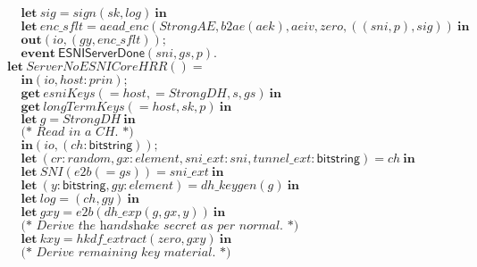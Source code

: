\documentclass{article}
\theoremstyle{definition}
\newcommand{\kwl}[1]{\mathbf{#1}}
\newcommand{\kwt}[1]{\mathsf{#1}}
\newcommand{\kwe}[1]{\mathsf{#1}}
\newcommand{\var}[1]{\mathit{#1}}
\theoremstyle{definition}
\begin{document}
\begin{tabbing}
$\ \ \ \ \ \kwl{let}\ \var{sig} = \var{sign}(\var{sk}, \var{log})\ \kwl{in} $\\
$\ \ \ \ \ \kwl{let}\ \var{enc{\_}sflt} = \var{aead{\_}enc}(\var{StrongAE}, \var{b2ae}(\var{aek}), \var{aeiv}, \var{zero}, ((\var{sni}, \var{p}), \var{sig}))\ \kwl{in} $\\
$\ \ \ \ \ \kwl{out}(\var{io}, (\var{gy}, \var{enc{\_}sflt})); $\\
$\ \ \ \ \ \kwl{event}\ \kwe{ESNIServerDone}(\var{sni}, \var{gs}, \var{p}). $\\
$ $\\
$\kwl{let}\ \var{ServerNoESNICoreHRR}() =  $\\
$\ \ \ \ \ \kwl{in}(\var{io}, \var{host}{:}\var{prin}); $\\
$\ \ \ \ \ \kwl{get}\ \var{esniKeys}( = \var{host},  = \var{StrongDH}, \var{s}, \var{gs})\ \kwl{in} $\\
$\ \ \ \ \ \kwl{get}\ \var{longTermKeys}( = \var{host}, \var{sk}, \var{p})\ \kwl{in} $\\
$\ \ \ \ \ \kwl{let}\ \var{g} = \var{StrongDH}\ \kwl{in} $\\
$ $\\
$\ \ \ \ \ \textit{(* Read in a CH. *)} $\\
$\ \ \ \ \ \kwl{in}(\var{io}, (\var{ch}{:}\kwt{bitstring})); $\\
$\ \ \ \ \ \kwl{let}\ (\var{cr}{:}\var{random}, \var{gx}{:}\var{element}, \var{sni{\_}ext}{:}\var{sni}, \var{tunnel{\_}ext}{:}\kwt{bitstring}) = \var{ch}\ \kwl{in} $\\
$\ \ \ \ \ \kwl{let}\ \var{SNI}(\var{e2b}( = \var{gs})) = \var{sni{\_}ext}\ \kwl{in} $\\
$ $\\
$\ \ \ \ \ \kwl{let}\ (\var{y}{:}\kwt{bitstring}, \var{gy}{:}\var{element}) = \var{dh{\_}keygen}(\var{g})\ \kwl{in} $\\
$\ \ \ \ \ \kwl{let}\ \var{log} = (\var{ch}, \var{gy})\ \kwl{in} $\\
$\ \ \ \ \ \kwl{let}\ \var{gxy} = \var{e2b}(\var{dh{\_}exp}(\var{g}, \var{gx}, \var{y}))\ \kwl{in} $\\
$ $\\
$\ \ \ \ \ \textit{(* Derive the handshake secret as per normal. *)} $\\
$\ \ \ \ \ \kwl{let}\ \var{kxy} = \var{hkdf{\_}extract}(\var{zero}, \var{gxy})\ \kwl{in} $\\
$ $\\
$\ \ \ \ \ \textit{(* Derive remaining key material. *)} $\\

\end{tabbing}
\end{document}
